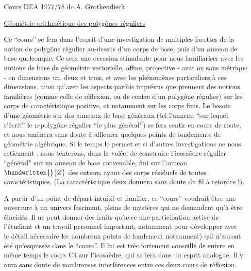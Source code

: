 \begin{center}
Cours DEA 1977/78 de A. Grothendieck

\uline{Géométrie arithmétique des polygônes réguliers}
\end{center}

{\reversemarginpar\margin{\handwritten{!}}\normalmarginpar}%
Ce ``cours'' se fera dans l'esprit d'une investigation  de multiples facettes de la notion de polygône régulier au-dessus d'un corps de base, puis d'un anneau de base quelconque. Ce sera une occasion stimulante pour nous familiariser avec les notions de base de géométrie vectorielle, affine, projective - avec ou sans métrique - en dimensions un, deux et trois, et avec les phénomènes particuliers à ces dimensions, ainsi qu'avec les aspects parfois imprévus que prennent des notions familières (comme celle de réflexion, ou de centre d'un polygône régulier) sur les corps de caractéristique positive, et notamment sur les corps finis. Le besoin d'une géométrie sur des anneaux de base généraux (tel l'anneau ``sur lequel s'écrit'' le $\mathrm{n}$-polygône régulier ``le plus général'') se fera sentir en cours de route, et nous amènera sans doute à affleurer quelques points de fondements de géométrie algébrique. Si le temps le permet et si d'autres investigations ne nous retiennent , nous tenterons, dans la volée, de construire l'icosaèdre régulier ``général'' sur un anneau de base convenable, fini sur l'anneau ${\handwritten{\mathbb}{Z}}$ des entiers, ayant des corps résiduels de toutes caractéristiques. (La caractéristique deux \hspace{.5em}donnera sans doute du fil à retordre !).

A partir d'un point de départ intuitif et familier, ce ``cours'' voudrait être une ouverture à un univers fascinant, pleins de mystères qui ne demandent qu'à être élucidés. Il ne peut donner des fruits qu'avec une participation active de l'étudiant et un travail personnel important, notamment pour développer avec\\
le détail nécessaire les nombreux points \handwritten{(}de fondement notamment) qui n'auront été qu'esquissés dans le ``cours''. Il lui est très fortement conseillé de suivre en même temps le cours C4 sur l'icosaèdre, qui se fera dans un esprit analogue. Il y aura sans doute de nombreuses interférences entre ces deux cours de réflexion.

